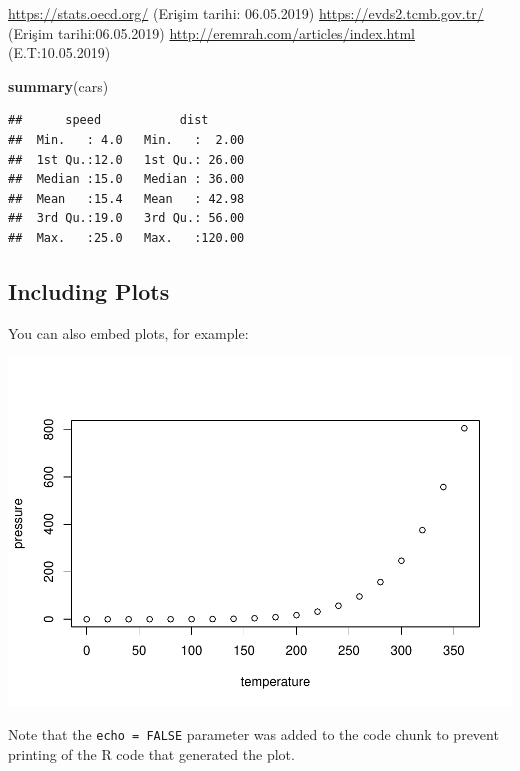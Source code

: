 \documentclass[]{article}
\newenvironment{Shaded}{\begin{snugshade}}{\end{snugshade}}
\newcommand{\KeywordTok}[1]{\textcolor[rgb]{0.13,0.29,0.53}{\textbf{#1}}}
\newcommand{\NormalTok}[1]{#1}
\begin{document}
\url{https://stats.oecd.org/} (Erişim tarihi: 06.05.2019)
\url{https://evds2.tcmb.gov.tr/} (Erişim tarihi:06.05.2019)
\url{http://eremrah.com/articles/index.html} (E.T:10.05.2019)

\begin{Shaded}
\begin{Highlighting}[]
\KeywordTok{summary}\NormalTok{(cars)}
\end{Highlighting}
\end{Shaded}

\begin{verbatim}
##      speed           dist       
##  Min.   : 4.0   Min.   :  2.00  
##  1st Qu.:12.0   1st Qu.: 26.00  
##  Median :15.0   Median : 36.00  
##  Mean   :15.4   Mean   : 42.98  
##  3rd Qu.:19.0   3rd Qu.: 56.00  
##  Max.   :25.0   Max.   :120.00
\end{verbatim}

\subsection{Including Plots}\label{including-plots}

You can also embed plots, for example:

\includegraphics{EconProject_files/figure-latex/pressure-1.pdf}

Note that the \texttt{echo\ =\ FALSE} parameter was added to the code
chunk to prevent printing of the R code that generated the plot.
\end{document}
